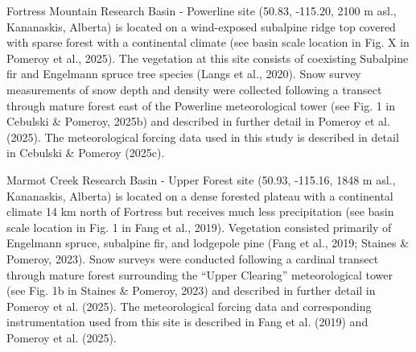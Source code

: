 \documentclass[
  letterpaper,
]{tex/uofsthesis-cs}
\begin{document}
Fortress Mountain Research Basin - Powerline site (50.83, -115.20, 2100
m asl., Kananaskis, Alberta) is located on a wind-exposed subalpine
ridge top covered with sparse forest with a continental climate (see
basin scale location in Fig. X in Pomeroy et al., 2025). The vegetation
at this site consists of coexisting Subalpine fir and Engelmann spruce
tree species (Langs et al., 2020). Snow survey measurements of snow
depth and density were collected following a transect through mature
forest east of the Powerline meteorological tower (see Fig. 1 in
Cebulski \& Pomeroy, 2025b) and described in further detail in Pomeroy
et al. (2025). The meteorological forcing data used in this study is
described in detail in Cebulski \& Pomeroy (2025c).

Marmot Creek Research Basin - Upper Forest site (50.93, -115.16, 1848 m
asl., Kananaskis, Alberta) is located on a dense forested plateau with a
continental climate 14 km north of Fortress but receives much less
precipitation (see basin scale location in Fig. 1 in Fang et al., 2019).
Vegetation consisted primarily of Engelmann spruce, subalpine fir, and
lodgepole pine (Fang et al., 2019; Staines \& Pomeroy, 2023). Snow
surveys were conducted following a cardinal transect through mature
forest surrounding the ``Upper Clearing'' meteorological tower (see Fig.
1b in Staines \& Pomeroy, 2023) and described in further detail in
Pomeroy et al. (2025). The meteorological forcing data and corresponding
instrumentation used from this site is described in Fang et al. (2019)
and Pomeroy et al. (2025).
\end{document}
